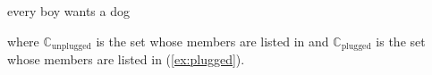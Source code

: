 \begin{ex} 
\begin{subex} 
 
\item every boy wants a dog 
 
\item


\newsavebox{\plugged}
\sbox{}
                              


 
\end{subex} 
   
\end{ex} 
where $\mathbb{C}_{\mathrm{unplugged}}$ is the set whose members are
listed in \nexteg{} and $\mathbb{C}_{\mathrm{plugged}}$ is the set
whose members are listed in (\ref{ex:plugged}).
\newsavebox{\unpluggeda}
\sbox{}

